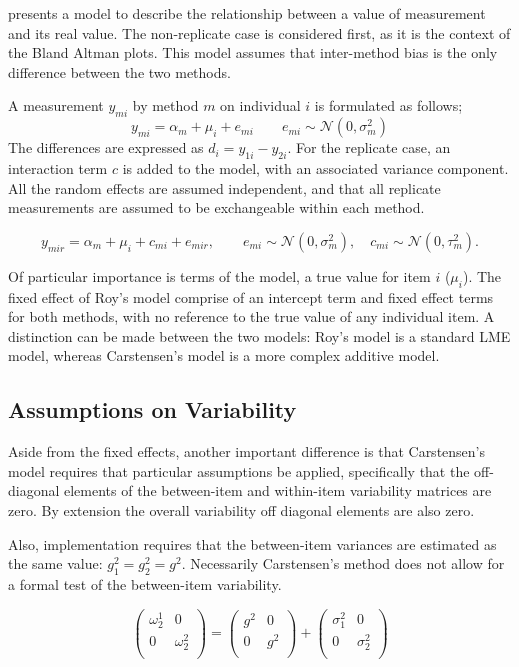 \documentclass[12pt, a4paper]{report}
\theoremstyle{plain}
\theoremstyle{definition}
\theoremstyle{remark}
\begin{document}
\citet{BXC2004} presents a model to describe the relationship between a value of measurement and its
real value. The non-replicate case is considered first, as it is the context of the Bland Altman plots. This model assumes that inter-method bias is the only difference between the two methods.

A measurement $y_{mi}$ by method $m$ on individual $i$ is formulated as follows;
\begin{equation}
y_{mi}  = \alpha_{m} + \mu_{i} + e_{mi} \qquad  e_{mi} \sim
\mathcal{N}(0,\sigma^{2}_{m})
\end{equation}
The differences are expressed as $d_{i} = y_{1i} - y_{2i}$. For the replicate case, an interaction term $c$ is added to the model, with an associated variance component. All the random effects are assumed independent, and that all replicate measurements are assumed to be exchangeable within each method.

\begin{equation}
y_{mir}  = \alpha_{m} + \mu_{i} + c_{mi} + e_{mir}, \qquad  e_{mi}
\sim \mathcal{N}(0,\sigma^{2}_{m}), \quad c_{mi} \sim \mathcal{N}(0,\tau^{2}_{m}).
\end{equation}

Of particular importance is terms of the model, a true value for item $i$ ($\mu_{i}$).  The fixed effect of Roy's model comprise of an intercept term and fixed effect terms for both methods, with no reference to the true value of any individual item. A distinction can be made between the two models: Roy's model is a standard LME model, whereas Carstensen's model is a more complex additive model.


\subsection{Assumptions on Variability}

Aside from the fixed effects, another important difference is that Carstensen's model requires that particular assumptions be applied, specifically that the off-diagonal elements of the between-item
and within-item variability matrices are zero. By extension the
overall variability off diagonal elements are also zero.

Also, implementation requires that the between-item variances are
estimated as the same value: $g^2_1 = g^2_2 = g^2$. Necessarily
Carstensen's method does not allow for a formal test of the
between-item variability.

\[\left(\begin{array}{cc}
\omega^1_2  & 0 \\
0 & \omega^2_2 \\
\end{array}  \right)
=  \left(
\begin{array}{cc}
g^2  & 0 \\
0 & g^2 \\
\end{array} \right)+
\left(
\begin{array}{cc}
\sigma^2_1  & 0 \\
0 & \sigma^2_2 \\
\end{array}\right)
\]
\end{document}
